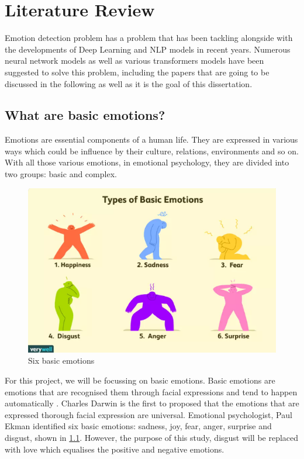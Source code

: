 
\chapter{Literature Review}

Emotion detection problem has a problem that has been tackling alongside with the developments of Deep Learning and NLP models in recent years. 
Numerous neural network models as well as various transformers models have been suggested to solve this problem, including the papers that are going to be discussed in the following as well as it is the goal of this dissertation.

\section{What are basic emotions?}
Emotions are essential components of a human life. They are expressed in various ways which could be influence by their culture, relations, environments and so on. With all those various emotions, in emotional psychology, they are divided into two groups: basic and complex.

\begin{figure}[ht]
    \centerline{\includegraphics[scale=0.72]{Figures/six_emotions.png}}
    \caption{Six basic emotions}
    \label{fig:emotions}
 \end{figure}

For this project, we will be focussing on basic emotions. Basic emotions are emotions that are recognised them through facial expressions and tend to happen automatically \cite{Uwa_2023}. Charles Darwin is the first to proposed that the emotions that are expressed thorough facial expression are universal. Emotional psychologist, Paul Ekman identified six basic emotions: sadness, joy, fear, anger, surprise and disgust, shown in \ref{fig:emotions}. However, the purpose of this study, disgust will be replaced with love which equalises the positive and negative emotions.

